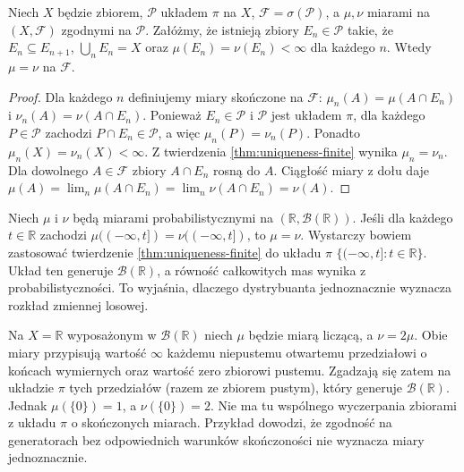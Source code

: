 \begin{twierdzenie}
\label{thm:uniqueness-sigma-finite}
Niech $X$ będzie zbiorem, $\mathcal P$ układem $\pi$ na $X$,
$\mathcal F=\sigma(\mathcal P)$, a $\mu,\nu$ miarami
na $(X,\mathcal F)$ zgodnymi na $\mathcal P$.
Załóżmy, że istnieją zbiory $E_n\in\mathcal P$ takie, że
$E_n\subseteq E_{n+1}$, $\bigcup_nE_n=X$ oraz
$\mu(E_n)=\nu(E_n)<\infty$ dla każdego $n$.
Wtedy $\mu=\nu$ na $\mathcal F$.
\end{twierdzenie}
\begin{proof}
Dla każdego $n$ definiujemy miary skończone na $\mathcal F$:
$\mu_n(A)=\mu(A\cap E_n)$ i
$\nu_n(A)=\nu(A\cap E_n)$.
Ponieważ $E_n\in\mathcal P$ i $\mathcal P$ jest układem $\pi$,
dla każdego $P\in\mathcal P$ zachodzi
$P\cap E_n\in\mathcal P$, a więc
$\mu_n(P)=\nu_n(P)$. Ponadto
$\mu_n(X)=\nu_n(X)<\infty$. Z twierdzenia
\ref{thm:uniqueness-finite} wynika $\mu_n=\nu_n$.
Dla dowolnego $A\in\mathcal F$ zbiory
$A\cap E_n$ rosną do $A$. Ciągłość miary z dołu
daje
$\mu(A)=\lim_n\mu(A\cap E_n)
=\lim_n\nu(A\cap E_n)=\nu(A)$.
\end{proof}

\begin{przyklad}
\label{ex:unique-cdf}
Niech $\mu$ i $\nu$ będą miarami probabilistycznymi
na $(\mathbb R,\mathcal B(\mathbb R))$.
Jeśli dla każdego $t\in\mathbb R$ zachodzi
$\mu((-\infty,t])=\nu((-\infty,t])$, to $\mu=\nu$.
Wystarczy bowiem zastosować twierdzenie
\ref{thm:uniqueness-finite} do układu $\pi$
$\{(-\infty,t]:t\in\mathbb R\}$.
Układ ten generuje $\mathcal B(\mathbb R)$,
a równość całkowitych mas wynika z probabilistyczności.
To wyjaśnia, dlaczego dystrybuanta jednoznacznie
wyznacza rozkład zmiennej losowej.
\end{przyklad}

\begin{przyklad}
\label{ex:uniqueness-fails}
Na $X=\mathbb R$ wyposażonym w $\mathcal B(\mathbb R)$
niech $\mu$ będzie miarą liczącą, a $\nu=2\mu$.
Obie miary przypisują wartość $\infty$ każdemu niepustemu
otwartemu przedziałowi o końcach wymiernych oraz wartość
zero zbiorowi pustemu. Zgadzają się zatem na układzie
$\pi$ tych przedziałów (razem ze zbiorem pustym),
który generuje $\mathcal B(\mathbb R)$.
Jednak $\mu(\{0\})=1$, a $\nu(\{0\})=2$.
Nie ma tu wspólnego wyczerpania zbiorami z układu $\pi$
o skończonych miarach. Przykład dowodzi, że zgodność
na generatorach bez odpowiednich warunków skończoności
nie wyznacza miary jednoznacznie.
\end{przyklad}

